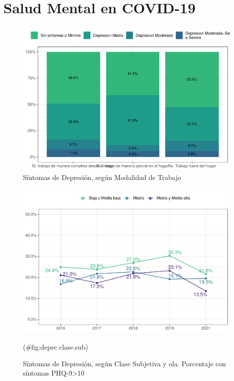 \documentclass[
  12pt,
]{book}
\begin{document}
\hypertarget{salud-mental-en-covid-19}{%
\section{Salud Mental en COVID-19}\label{salud-mental-en-covid-19}}

\begin{figure}

{\centering \includegraphics{reporte-elsoc_files/figure-latex/depre-teletrabajo-1} 

}

\caption{Síntomas de Depresión, según Modalidad de Trabajo}\label{fig:depre-teletrabajo}
\end{figure}

\begin{figure}

{\centering \includegraphics{reporte-elsoc_files/figure-latex/depre clase.sub-1} 

}

\caption{Síntomas de Depresión, según Clase Subjetiva y ola. Porcentaje con síntomas PHQ-9>10}(\#fig:depre clase.sub)
\end{figure}
\end{document}
